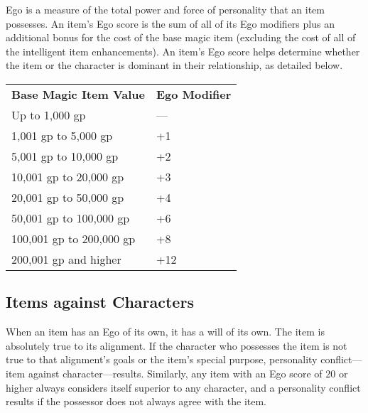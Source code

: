 				
Ego is a measure of the total power and force of personality that an item possesses. An item's Ego score is the sum of all of its Ego modifiers plus an additional bonus for the cost of the base magic item (excluding the cost of all of the intelligent item enhancements). An item's Ego score helps determine whether the item or the character is dominant in their relationship, as detailed below.


\begin{tabularx}{\linewidth}{lX}
\textbf{Base Magic Item Value} & \textbf{Ego Modifier} \\
Up to 1,000 gp                 & ---                     \\
1,001 gp to 5,000 gp           & +1                    \\
5,001 gp to 10,000 gp          & +2                    \\
10,001 gp to 20,000 gp         & +3                    \\
20,001 gp to 50,000 gp         & +4                    \\
50,001 gp to 100,000 gp        & +6                    \\
100,001 gp to 200,000 gp       & +8                    \\
200,001 gp and higher          & +12                  
\end{tabularx}

				
\subsection{Items against Characters}

				
When an item has an Ego of its own, it has a will of its own. The item is absolutely true to its alignment. If the character who possesses the item is not true to that alignment's goals or the item's special purpose, personality conflict---item against character---results. Similarly, any item with an Ego score of 20 or higher always considers itself superior to any character, and a personality conflict results if the possessor does not always agree with the item.
				
